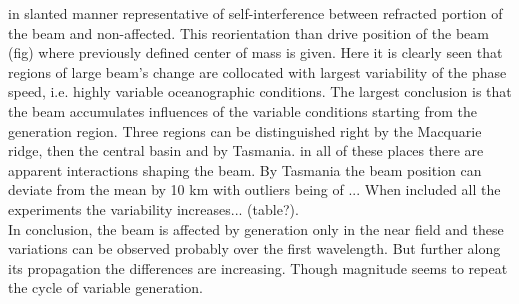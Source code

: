 \documentclass[12pt]{article}
\begin{document}
in slanted manner representative of self-interference between refracted portion of the beam 
and non-affected. This reorientation than drive position of the beam (fig) where previously defined 
center of mass is given. Here it is clearly seen that regions of large beam's change are collocated 
with largest variability of the phase speed, i.e. highly variable oceanographic conditions. The 
largest conclusion is that the beam accumulates influences of the variable conditions starting from 
the generation region. Three regions can be distinguished right by the Macquarie ridge, then the 
central basin and by Tasmania. in all of these places there are apparent interactions shaping the 
beam. By Tasmania the beam position can deviate from the mean by 10 km with outliers being of ... 
When included all the experiments the variability increases... (table?).\\
In conclusion, the beam is affected by generation only in the near field and these variations can 
be observed probably over the first wavelength. But further along its propagation the differences 
are increasing. Though magnitude seems to repeat the cycle of variable generation.\\
\end{document}

